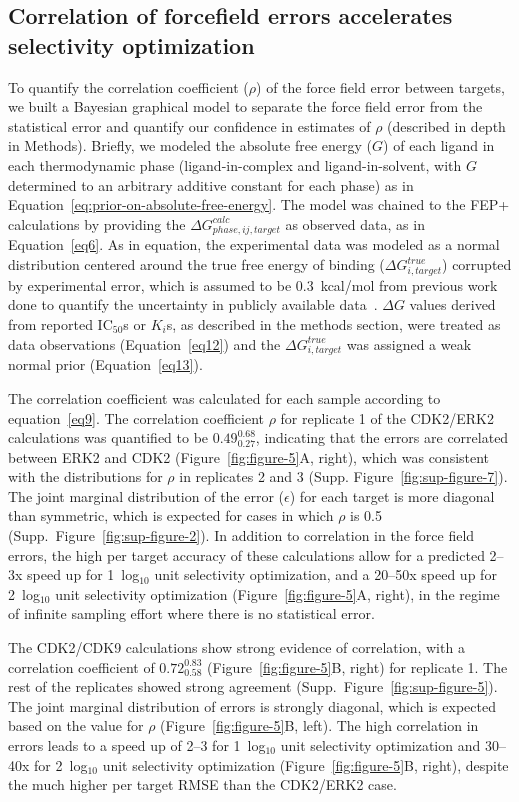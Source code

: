 \documentclass[phd,tocprelim]{cornell}
\begin{document}
\subsection{Correlation of forcefield errors accelerates selectivity optimization}
To quantify the correlation coefficient ($\rho$) of the force field error between targets, we built a Bayesian graphical model to separate the force field error from the statistical error and quantify our confidence in estimates of $\rho$ (described in depth in Methods). 
Briefly, we modeled the absolute free energy ($G$) of each ligand in each thermodynamic phase (ligand-in-complex and ligand-in-solvent, with $G$ determined to an arbitrary additive constant for each phase) as in Equation~\ref{eq:prior-on-absolute-free-energy}. 
The model was chained to the FEP+ calculations by providing the $\Delta G^{calc}_{phase,ij,target}$ as observed data, as in Equation~\ref{eq6}. As in equation, the experimental data was modeled as a normal distribution centered around the true free energy of binding ($\Delta G^{true}_{i,target}$) corrupted by experimental error, which is assumed to be 0.3~kcal/mol from previous work done to quantify the uncertainty in publicly available data~\citep{BROWN2009420}. 
$\Delta G$ values derived from reported IC$_{50}$s or $K_i$s, as described in the methods section, were treated as data observations (Equation~\ref{eq12}) and the $\Delta G^{true}_{i,target}$ was assigned a weak normal prior (Equation~\ref{eq13}). 

The correlation coefficient was calculated for each sample according to equation~\ref{eq9}. 
The correlation coefficient $\rho$ for replicate 1 of the CDK2/ERK2 calculations was quantified to be $0.49^{0.68}_{0.27}$, indicating that the errors are correlated between ERK2 and CDK2 (Figure~\ref{fig:figure-5}A, right), which was consistent with the distributions for $\rho$ in replicates 2 and 3 (Supp. Figure~\ref{fig:sup-figure-7}). 
The joint marginal distribution of the error ($\epsilon$) for each target is more diagonal than symmetric, which is expected for cases in which $\rho$ is 0.5 (Supp.\ Figure~\ref{fig:sup-figure-2}). 
In addition to correlation in the force field errors, the high per target accuracy of these calculations allow for a predicted 2--3x speed up for 1~log$_{10}$ unit selectivity optimization, and a 20--50x speed up for 2~log$_{10}$ unit selectivity optimization (Figure~\ref{fig:figure-5}A, right), in the regime of infinite sampling effort where there is no statistical error. 

The CDK2/CDK9 calculations show strong evidence of correlation, with a correlation coefficient of $0.72^{0.83}_{0.58}$ (Figure~\ref{fig:figure-5}B, right) for replicate 1. 
The rest of the replicates showed strong agreement (Supp.\ Figure~\ref{fig:sup-figure-5}). The joint marginal distribution of errors is strongly diagonal, which is expected based on the value for $\rho$ (Figure~\ref{fig:figure-5}B, left). 
The high correlation in errors leads to a speed up of 2--3 for 1~log$_{10}$ unit selectivity optimization and 30--40x for 2~log$_{10}$ unit selectivity optimization (Figure~\ref{fig:figure-5}B, right), despite the much higher per target RMSE than the CDK2/ERK2 case. 
\end{document}
